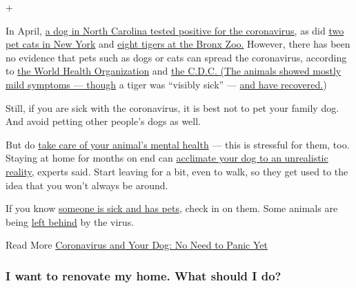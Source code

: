 +

In April,
\href{https://www.nytimes3xbfgragh.onion/2020/04/28/us/dog-coronavirus-positive-test.html}{a
dog in North Carolina tested positive for the coronavirus,} as did
\href{https://www.nytimes3xbfgragh.onion/2020/04/22/health/cats-pets-coronavirus.html}{two
pet cats in New York} and
\href{https://newsroom.wcs.org/News-Releases/articleType/ArticleView/articleId/14084/Update-Bronx-Zoo-Tigers-and-Lions-Recovering-from-COVID-19.aspx}{eight
tigers at the Bronx Zoo.} However, there has been no evidence that pets
such as dogs or cats can spread the coronavirus, according to
\href{https://www.who.int/docs/default-source/inaugural-who-partners-forum/coronavirus-poster-english-srilanka.pdf?sfvrsn=289dedc3_0}{the
World Health Organization} and
\href{https://www.cdc.gov/coronavirus/2019-ncov/daily-life-coping/animals.html?CDC_AA_refVal=https\%3A\%2F\%2Fwww.cdc.gov\%2Fcoronavirus\%2F2019-ncov\%2Fprepare\%2Fanimals.html}{the
C.D.C. (The animals showed mostly mild symptoms --- though} a tiger was
``visibly sick'' ---
\href{https://www.cdc.gov/coronavirus/2019-ncov/daily-life-coping/animals.html?CDC_AA_refVal=https\%3A\%2F\%2Fwww.cdc.gov\%2Fcoronavirus\%2F2019-ncov\%2Fprepare\%2Fanimals.html}{and
have recovered.})

Still, if you are sick with the coronavirus, it is best not to pet your
family dog. And avoid petting other people's dogs as well.

But do
\href{https://www.nytimes3xbfgragh.onion/2020/04/21/well/coronavirus-pet-care-grooming.html}{take
care of your animal's mental health} --- this is stressful for them,
too. Staying at home for months on end can
\href{https://www.nytimes3xbfgragh.onion/2020/05/27/smarter-living/how-to-prepare-your-dog-to-be-left-at-home-alone-again.html}{acclimate
your dog to an unrealistic reality,} experts said. Start leaving for a
bit, even to walk, so they get used to the idea that you won't always be
around.

If you know
\href{https://www.nytimes3xbfgragh.onion/2020/04/19/world/europe/coronavirus-spain-pets.html}{someone
is sick and has pets,} check in on them. Some animals are being
\href{https://www.nytimes3xbfgragh.onion/2020/06/23/nyregion/coronavirus-pets.html}{left
behind} by the virus.

 Read More
\href{https://www.nytimes3xbfgragh.onion/2020/03/04/science/animals-pets-coronavirus.html}{Coronavirus
and Your Dog: No Need to Panic Yet}

\hypertarget{i-want-to-renovate-my-home-what-should-i-do}{%
\subsubsection{I want to renovate my home. What should I
do?}\label{i-want-to-renovate-my-home-what-should-i-do}}

